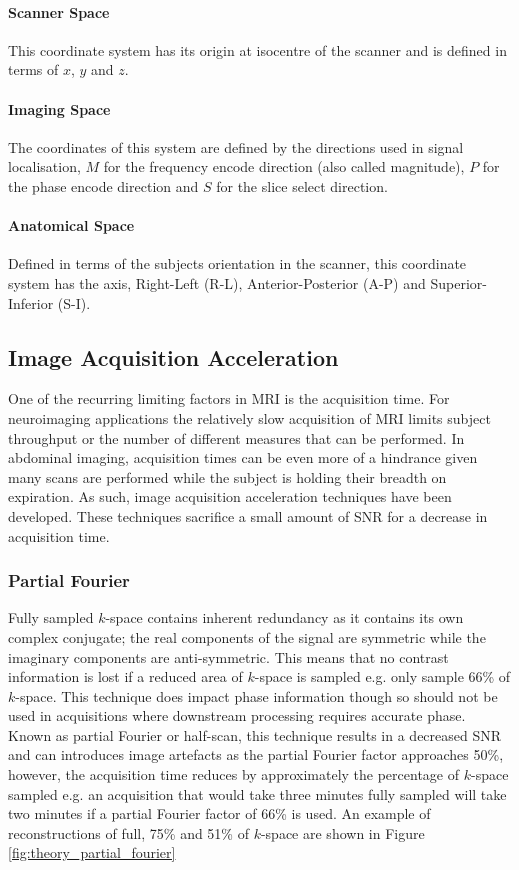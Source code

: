 \paragraph{Scanner Space}
This coordinate system has its origin at isocentre of the scanner and is defined in terms of $x$, $y$ and $z$.
\paragraph{Imaging Space}
The coordinates of this system are defined by the directions used in signal localisation, $M$ for the frequency encode direction (also called magnitude), $P$ for the phase encode direction and $S$ for the slice select direction.
\paragraph{Anatomical Space}
Defined in terms of the subjects orientation in the scanner, this coordinate system has the axis, Right-Left (R-L), Anterior-Posterior (A-P) and Superior-Inferior (S-I).

\subsection{Image Acquisition Acceleration}
One of the recurring limiting factors in \ac{MRI} is the acquisition time. For neuroimaging applications the relatively slow acquisition of \ac{MRI} limits subject throughput or the number of different measures that can be performed. In abdominal imaging, acquisition times can be even more of a hindrance given many scans are performed while the subject is holding their breadth on expiration. As such, image acquisition acceleration techniques have been developed. These techniques sacrifice a small amount of \ac{SNR} for a decrease in acquisition time.

\subsubsection{Partial Fourier}
Fully sampled $k$-space contains inherent redundancy as it contains its own complex conjugate; the real components of the signal are symmetric while the imaginary components are anti-symmetric. This means that no contrast information is lost if a reduced area of $k$-space is sampled e.g. only sample 66\% of $k$-space. This technique does impact phase information though so should not be used in acquisitions where downstream processing requires accurate phase. Known as partial Fourier or half-scan, this technique results in a decreased \ac{SNR} and can introduces image artefacts as the partial Fourier factor approaches 50\%, however, the acquisition time reduces by approximately the percentage of $k$-space sampled e.g. an acquisition that would take three minutes fully sampled will take two minutes if a partial Fourier factor of 66\% is used. An example of reconstructions of full, 75\% and 51\% of $k$-space are shown in Figure \ref{fig:theory_partial_fourier}

